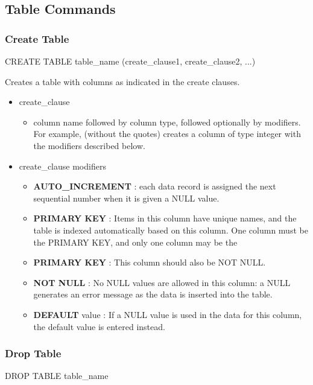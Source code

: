 \subsection{Table Commands}
\subsubsection{Create Table}
\begin{sqlcode}
CREATE TABLE table_name (create_clause1, create_clause2, ...)
\end{sqlcode}

Creates a table with columns as indicated in the create clauses.
\begin{itemize}
\item create\_clause
\begin{itemize}
	\item column name followed by column type, followed optionally by modifiers. 
	For example,  (without the quotes) 
	creates a column of type integer with the modifiers described below.
\end{itemize}
\item create\_clause modifiers
\begin{itemize}
	\item \textbf{AUTO\_INCREMENT} : each data record is assigned the next sequential number when it is given a NULL value.
	\item \textbf{PRIMARY KEY} : Items in this column have unique names, and the table is	indexed automatically based on this column.	One column must be the PRIMARY KEY, and only one column may be the
	\item \textbf{PRIMARY KEY} : This column should also be NOT NULL.
	\item \textbf{NOT NULL} : No NULL values are allowed in this column: a NULL generates an error message as the data is inserted into the table.
	\item \textbf{DEFAULT} value : If a NULL value is used in the data for this column, the default value is entered instead.
\end{itemize}
\end{itemize}

\subsubsection{Drop Table}
\begin{sqlcode}
DROP TABLE table_name
\end{sqlcode}

